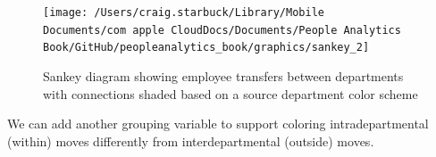 \documentclass[
]{book}
\newenvironment{Shaded}{\begin{snugshade}}{\end{snugshade}}
\newcommand{\CommentTok}[1]{\textcolor[rgb]{0.56,0.35,0.01}{\textit{#1}}}
\newcommand{\ConstantTok}[1]{\textcolor[rgb]{0.00,0.00,0.00}{#1}}
\newcommand{\DecValTok}[1]{\textcolor[rgb]{0.00,0.00,0.81}{#1}}
\newcommand{\FunctionTok}[1]{\textcolor[rgb]{0.00,0.00,0.00}{#1}}
\newcommand{\NormalTok}[1]{#1}
\newcommand{\OtherTok}[1]{\textcolor[rgb]{0.56,0.35,0.01}{#1}}
\newcommand{\SpecialCharTok}[1]{\textcolor[rgb]{0.00,0.00,0.00}{#1}}
\newcommand{\StringTok}[1]{\textcolor[rgb]{0.31,0.60,0.02}{#1}}
\begin{document}
\begin{Shaded}
\end{Shaded}

\begin{figure}

{\centering \texttt{[image: /Users/craig.starbuck/Library/Mobile Documents/com~apple~CloudDocs/Documents/People Analytics Book/GitHub/peopleanalytics\_book/graphics/sankey\_2]} 

}

\caption{Sankey diagram showing employee transfers between departments with connections shaded based on a source department color scheme}\label{fig:sankey-2}
\end{figure}

We can add another grouping variable to support coloring intradepartmental (within) moves differently from interdepartmental (outside) moves.
\end{document}
